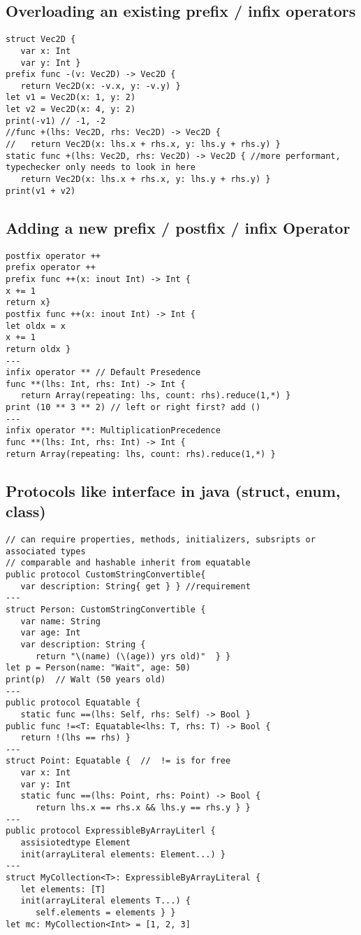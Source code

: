 \subsection{Overloading an existing prefix / infix operators}
\begin{lstlisting}
struct Vec2D {
   var x: Int
   var y: Int }
prefix func -(v: Vec2D) -> Vec2D {
   return Vec2D(x: -v.x, y: -v.y) }
let v1 = Vec2D(x: 1, y: 2)
let v2 = Vec2D(x: 4, y: 2)
print(-v1) // -1, -2
//func +(lhs: Vec2D, rhs: Vec2D) -> Vec2D {
//   return Vec2D(x: lhs.x + rhs.x, y: lhs.y + rhs.y) }
static func +(lhs: Vec2D, rhs: Vec2D) -> Vec2D { //more performant, typechecker only needs to look in here
   return Vec2D(x: lhs.x + rhs.x, y: lhs.y + rhs.y) }
print(v1 + v2)
\end{lstlisting}

\subsection{Adding a new prefix / postfix / infix Operator}
\begin{lstlisting}
postfix operator ++
prefix operator ++
prefix func ++(x: inout Int) -> Int {
x += 1
return x}
postfix func ++(x: inout Int) -> Int {
let oldx = x
x += 1
return oldx }
---
infix operator ** // Default Presedence
func **(lhs: Int, rhs: Int) -> Int {
   return Array(repeating: lhs, count: rhs).reduce(1,*) }
print (10 ** 3 ** 2) // left or right first? add ()
---
infix operator **: MultiplicationPrecedence
func **(lhs: Int, rhs: Int) -> Int {
return Array(repeating: lhs, count: rhs).reduce(1,*) }
\end{lstlisting}


\subsection{Protocols like interface in java (struct, enum, class)}
\begin{lstlisting}
// can require properties, methods, initializers, subsripts or associated types
// comparable and hashable inherit from equatable
public protocol CustomStringConvertible{
   var description: String{ get } } //requirement
---
struct Person: CustomStringConvertible {
   var name: String
   var age: Int
   var description: String {
      return "\(name) (\(age)) yrs old)"  } }
let p = Person(name: "Wait", age: 50)
print(p)  // Walt (50 years old)
---
public protocol Equatable {
   static func ==(lhs: Self, rhs: Self) -> Bool }
public func !=<T: Equatable<lhs: T, rhs: T) -> Bool {
   return !(lhs == rhs) }
---
struct Point: Equatable {  //  != is for free
   var x: Int
   var y: Int
   static func ==(lhs: Point, rhs: Point) -> Bool {
      return lhs.x == rhs.x && lhs.y == rhs.y } }
---
public protocol ExpressibleByArrayLiterl {
   assisiotedtype Element
   init(arrayLiteral elements: Element...) }
---
struct MyCollection<T>: ExpressibleByArrayLiteral {
   let elements: [T]
   init(arrayLiteral elements T...) {
      self.elements = elements } }
let mc: MyCollection<Int> = [1, 2, 3]
\end{lstlisting}

